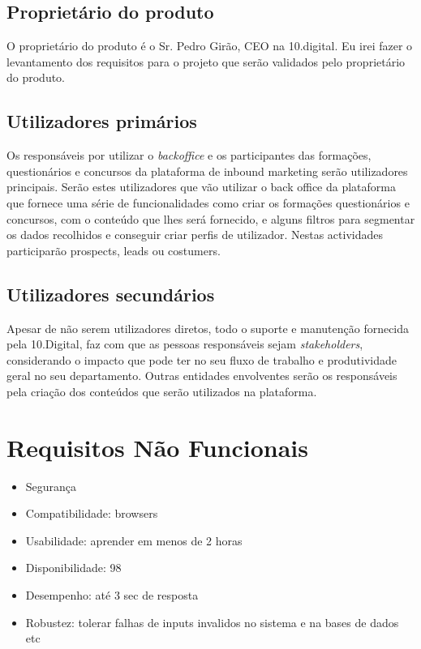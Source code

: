 \subsection{Proprietário do produto}

O proprietário do produto é o Sr. Pedro Girão, CEO na 10.digital. Eu irei fazer o levantamento dos requisitos para o projeto que serão validados pelo proprietário do produto.

\subsection{Utilizadores primários}

Os responsáveis por utilizar o \textit{backoffice} e os participantes das formações, questionários e concursos da plataforma de inbound marketing serão utilizadores principais. Serão estes utilizadores que vão utilizar o back office da plataforma que fornece uma série de funcionalidades como criar os formações questionários e concursos, com o conteúdo que lhes será fornecido, e alguns filtros para segmentar os dados recolhidos e conseguir criar perfis de utilizador. Nestas actividades participarão prospects, leads ou costumers.


\subsection{Utilizadores secundários}

Apesar de não serem utilizadores diretos, todo o suporte e manutenção fornecida pela 10.Digital, faz com que as pessoas responsáveis sejam \textit{stakeholders}, considerando o impacto que pode ter no seu fluxo de trabalho e produtividade geral no seu departamento. 
Outras entidades envolventes serão os responsáveis pela criação dos conteúdos que serão utilizados na plataforma.


\section{Requisitos Não Funcionais}
\label{rnf}
\begin{itemize}
	\item Segurança
	\item Compatibilidade: browsers
	\item Usabilidade: aprender em menos de 2 horas
	\item Disponibilidade: 98
	\item Desempenho: até 3 sec de resposta
	\item Robustez: tolerar falhas de inputs invalidos no sistema e na bases de dados etc
\end{itemize}

